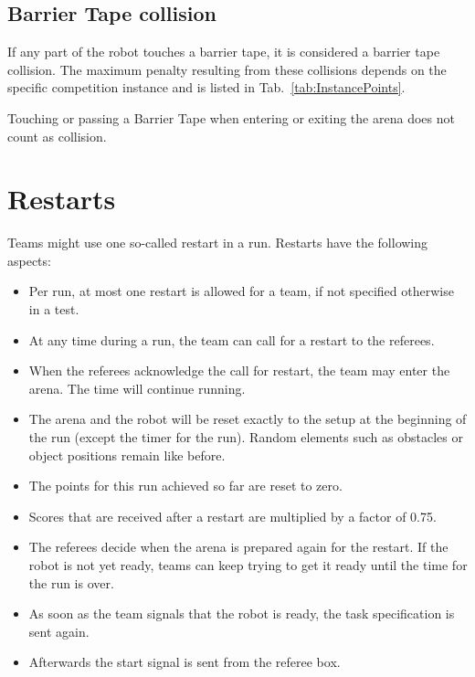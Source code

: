 \subsection{Barrier Tape collision}
If any part of the robot touches a barrier tape, it is considered a barrier tape collision. The maximum penalty resulting from these collisions depends on the specific competition instance and is listed in Tab.~\ref{tab:InstancePoints}.

Touching or passing a Barrier Tape when entering or exiting the arena does not count as collision.






\section{Restarts}
Teams might use one so-called restart in a run. Restarts have the following aspects:

\begin{itemize}

	\item Per run, at most one restart is allowed for a team, if not specified otherwise in a test.
	\item At any time during a run, the team can call for a restart to the referees.
	\item When the referees acknowledge the call for restart, the team may enter the arena. The time will continue running.
	\item The arena and the robot will be reset exactly to the setup at the beginning of the run (except the timer for the run). Random elements such as obstacles or object positions remain like before.
	\item The points for this run achieved so far are reset to zero.
	\item Scores that are received after a restart are multiplied by a factor of 0.75.
	\item The referees decide when the arena is prepared again for the restart. If the robot is not yet ready, teams can keep trying to get it ready until the time for the run is over.
	\item As soon as the team signals that the robot is ready, the task specification is sent again.
	\item Afterwards the start signal is sent from the referee box.

\end{itemize}


